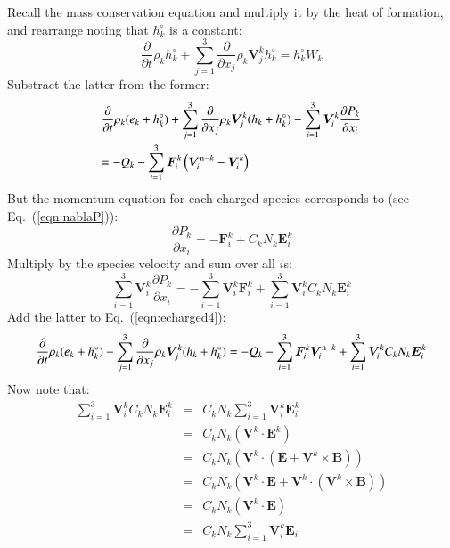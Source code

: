 \documentclass{warpdoc}
\newcommand{\alb}{\vspace{0.1cm}\\} %
\newcommand{\mfd}{\displaystyle}
\renewcommand{\vec}[1]{\bm{#1}}
\begin{document}
%  
Recall the mass conservation equation and multiply it by the heat of formation, and rearrange noting that $h_k^\circ$ is a constant:
%
\begin{equation}
 \frac{\partial }{\partial t}\rho_k h_k^\circ + \sum_{j=1}^3  \frac{\partial }{\partial x_j} \rho_k \vec{V}^k_j h_k^\circ 
=  h_k^\circ W_k
\end{equation}
%  
Substract the latter from the former:
%
\begin{equation}
\begin{array}{l}\mfd
 \frac{\partial }{\partial t}\rho_k (e_k+h_k^\circ) + \sum_{j=1}^3  \frac{\partial }{\partial x_j} \rho_k \vec{V}^k_j (h_k+h_k^\circ) 
- \sum_{i=1}^3 \vec{V}^k_i \frac{\partial P_k}{\partial x_i}
\alb\mfd= 
- Q_{k}
-\sum_{i=1}^3 \vec{F}_i^k \left( \vec{V}_i^{{\rm n}-k}-\vec{V}_i^k \right)
\end{array}
\label{eqn:echarged4}
\end{equation}
%  
But the momentum equation for each charged species corresponds to (see Eq.\ (\ref{eqn:nablaP})):
%
\begin{equation}
  \frac{\partial P_k}{\partial x_i} = -\vec{F}_i^k + C_k N_k \vec{E}^k_i
\end{equation}
%
Multiply by the species velocity and sum over all $i$s:
%
\begin{equation}
  \sum_{i=1}^3 \vec{V}_i^k \frac{\partial P_k}{\partial x_i} = -\sum_{i=1}^3 \vec{V}_i^k \vec{F}_i^k + \sum_{i=1}^3 \vec{V}_i^k C_k N_k \vec{E}^k_i
\end{equation}
%
Add the latter to Eq.\ (\ref{eqn:echarged4}):
%
\begin{equation}
 \frac{\partial }{\partial t}\rho_k (e_k+h_k^\circ) + \sum_{j=1}^3  \frac{\partial }{\partial x_j} \rho_k \vec{V}^k_j (h_k+h_k^\circ) 
= 
- Q_{k}
-\sum_{i=1}^3 \vec{F}_i^k \vec{V}_i^{{\rm n}-k} 
+\sum_{i=1}^3 \vec{V}_i^k C_k N_k \vec{E}^k_i
\end{equation}
%  
Now note that:
%
\begin{equation}
\begin{array}{rcl}
  \sum_{i=1}^3 \vec{V}_i^k C_k N_k \vec{E}^k_i 
     &=& C_k N_k \sum_{i=1}^3 \vec{V}_i^k \vec{E}^k_i \\
   ~ &=& C_k N_k  \left(\vec{V}^k \cdot \vec{E}^k \right) \\
   ~ &=& C_k N_k  \left(\vec{V}^k \cdot (\vec{E}+\vec{V}^k \times \vec{B}) \right)\\
   ~ &=& C_k N_k  \left(\vec{V}^k \cdot \vec{E}+ \vec{V}^k \cdot (\vec{V}^k \times \vec{B}) \right)\\
   ~ &=& C_k N_k  \left(\vec{V}^k \cdot \vec{E} \right)\\
   ~ &=& C_k N_k \sum_{i=1}^3 \vec{V}^k_i \vec{E}_i \\
\end{array}
\end{equation}
\end{document}
